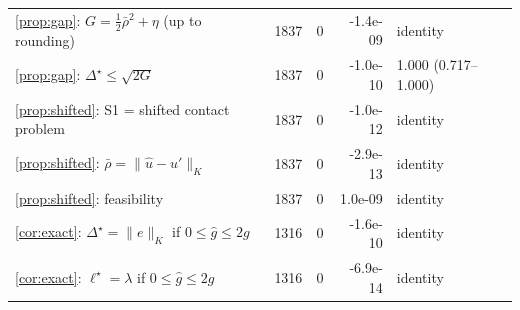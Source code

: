 \begin{tabular}{lrrrl}
\cref{prop:gap}: $G=\frac12\bar\rho^2+\eta$ (up to rounding) & 1837 & 0 & -1.4e-09 & identity \\
\cref{prop:gap}: $\Delta^\star\le\sqrt{2G}$ & 1837 & 0 & -1.0e-10 & 1.000 (0.717--1.000) \\
\cref{prop:shifted}: S1 = shifted contact problem & 1837 & 0 & -1.0e-12 & identity \\
\cref{prop:shifted}: $\bar\rho=\|\hat u-u'\|_K$ & 1837 & 0 & -2.9e-13 & identity \\
\cref{prop:shifted}: feasibility & 1837 & 0 & 1.0e-09 & identity \\
\cref{cor:exact}: $\Delta^\star=\|e\|_K$ if $0\le\hat g\le2g$ & 1316 & 0 & -1.6e-10 & identity \\
\cref{cor:exact}: $\ell^\star=\lambda$ if $0\le\hat g\le2g$ & 1316 & 0 & -6.9e-14 & identity \\
\hline
\end{tabular}
